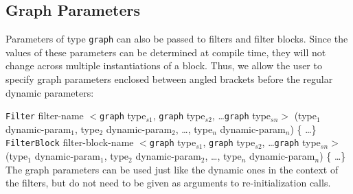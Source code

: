 \subsection{Graph Parameters}

Parameters of type {\tt graph} can also be passed to filters and
filter blocks.  Since the values of these parameters can be determined
at compile time, they will not change across multiple instantiations
of a block.  Thus, we allow the user to specify graph parameters
enclosed between angled brackets before the regular dynamic
parameters:

{\tt Filter} filter-name $<${\tt graph} type$_{s1}$, {\tt graph} type$_{s2}$, \dots {\tt graph} type$_{sn}>$ (type$_1$ dynamic-param$_1$, type$_2$ dynamic-param$_2$, \dots , type$_n$ dynamic-param$_n$) \{ \dots \} \\

{\tt FilterBlock} filter-block-name $<${\tt graph} type$_{s1}$, {\tt graph} type$_{s2}$, \dots {\tt graph} type$_{sn}>$ (type$_1$ dynamic-param$_1$, type$_2$ dynamic-param$_2$, \dots , type$_n$ dynamic-param$_n$) \{ \dots \} \\

The graph parameters can be used just like the dynamic ones in the
context of the filters, but do not need to be given as arguments to
re-initialization calls.



